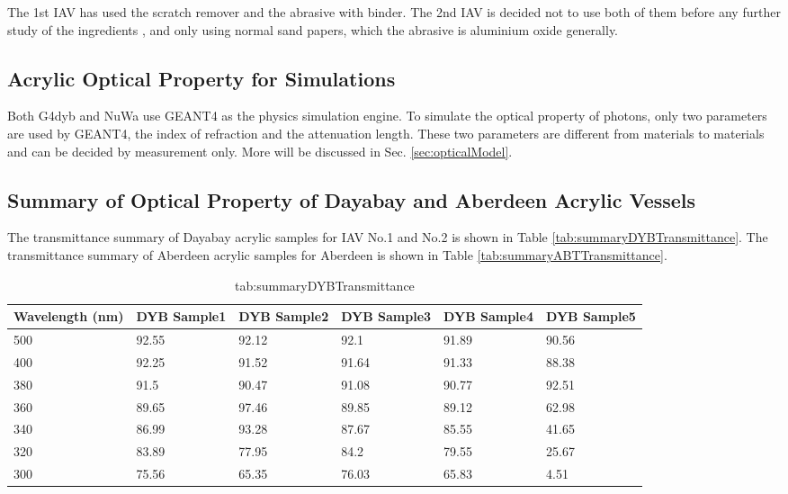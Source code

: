 The 1st IAV has used the scratch remover and the abrasive with binder. The 2nd
IAV is decided not to use both of them before any further study of the ingredients
, and only using normal sand papers, which the abrasive is aluminium oxide generally. 


\subsection {Acrylic Optical Property for Simulations}

Both G4dyb and NuWa use GEANT4 as the physics simulation engine.
To simulate the optical property of photons, only two parameters are used
by GEANT4, the index of refraction and the attenuation length. These two
parameters are different from materials to materials and can be decided
by measurement only.
More will be discussed in Sec. \ref{sec:opticalModel}.

\subsection {Summary of Optical Property of Dayabay and Aberdeen Acrylic Vessels}

The transmittance summary of Dayabay acrylic samples for IAV No.1 and No.2 is shown in Table \ref{tab:summaryDYBTransmittance}.
The transmittance summary of Aberdeen acrylic samples for Aberdeen is shown in Table \ref{tab:summaryABTTransmittance}.


\begin{table}
\centering
\caption{tab:summaryDYBTransmittance}
\label{tab:}
\begin{tabular}{lp{1.5cm}p{1.5cm}p{1.5cm}p{1.5cm}p{1.5cm}}
\hline
Wavelength (nm) & DYB Sample1 & DYB Sample2 & DYB Sample3 & DYB Sample4 & DYB Sample5 \\
\hline
\hline
500 & 92.55 &  92.12 &  92.1  &  91.89 &  90.56 \\
400 & 92.25 &  91.52 &  91.64 &  91.33 &  88.38 \\
380 & 91.5  &  90.47 &  91.08 &  90.77 &  92.51 \\
360 & 89.65 &  97.46 &  89.85 &  89.12 &  62.98 \\
340 & 86.99 &  93.28 &  87.67 &  85.55 &  41.65 \\
320 & 83.89 &  77.95 &  84.2  &  79.55 &  25.67 \\
300 & 75.56 &  65.35 &  76.03 &  65.83 &  4.51  \\
\hline
\end{tabular}
\end{table}



